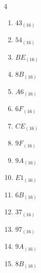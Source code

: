 \begin{multicols}{4}
\begin{enumerate}
  \item $43_{(16)}$

        \phantom{$=67$}

  \item $54_{(16)}$

        \phantom{$=84$}

  \item $BE_{(16)}$

        \phantom{$=190$}

  \item $8B_{(16)}$

        \phantom{$=139$}

  \item $A6_{(16)}$

        \phantom{$=166$}

  \item $6F_{(16)}$

        \phantom{$=111$}

  \item $CE_{(16)}$

        \phantom{$=206$}

  \item $9F_{(16)}$

        \phantom{$=159$}

  \item $9A_{(16)}$

        \phantom{$=154$}

\columnbreak %

\resetques

  \item $E1_{(16)}$

        \phantom{$=225$}

  \item $6B_{(16)}$

        \phantom{$=107$}

  \item $37_{(16)}$

        \phantom{$=55$}

  \item $97_{(16)}$

        \phantom{$=151$}

  \item $9A_{(16)}$

        \phantom{$=154$}

  \item $8B_{(16)}$

        \phantom{$=139$}


\end{enumerate}
\end{multicols}
